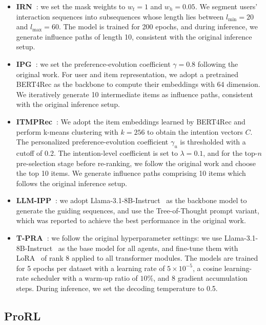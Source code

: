 \documentclass{llmxive}
\begin{document}
\begin{itemize}
    \item \textbf{IRN~\cite{zhu2023influential}}: we set the mask weights to \(w_t = 1\) and \(w_h = 0.05\). We segment users' interaction sequences into subsequences whose length lies between \(l_{\min} = 20\) and \(l_{\max} = 60\). The model is trained for 200 epochs, and during inference, we generate influence paths of length 10, consistent with the original inference setup.
    \item \textbf{IPG~\cite{bi2024proactive}}: we set the preference-evolution coefficient $\gamma=0.8$ following the original work. For user and item representation, we adopt a pretrained BERT4Rec as the backbone to compute their embeddings with 64 dimension. We iteratively generate 10 intermediate items as influence paths, consistent with the original inference setup.
    \item \textbf{ITMPRec~\cite{lian2025itmprec}}: We adopt the item embeddings learned by BERT4Rec and perform k-means clustering with \(k = 256\) to obtain the intention vectors $C$. The personalized preference-evolution coefficient \(\gamma_u\) is thresholded with a cutoff of 0.2. The intention-level coefficient is set to \(\lambda = 0.1\), and for the top-\(n\) pre-selection stage before re-ranking, we follow the original work and choose the top 10 items. We generate influence paths comprising 10 items which follows the original inference setup.
    \item \textbf{LLM-IPP~\cite{wang2025leveraging}}: we adopt Llama-3.1-8B-Instruct~\cite{dubey2024llama} as the backbone model to generate the guiding sequences, and use the Tree-of-Thought prompt variant, which was reported to achieve the best performance in the original work.
    \item \textbf{T-PRA~\cite{wang2025tunable}}: we follow the original hyperparameter settings: we use Llama-3.1-8B-Instruct~\cite{dubey2024llama} as the base model for all agents, and fine-tune them with LoRA~\cite{hu2022lora} of rank 8 applied to all transformer modules. The models are trained for 5 epochs per dataset with a learning rate of \(5\times10^{-5}\), a cosine learning-rate scheduler with a warm-up ratio of \(10\%\), and 8 gradient accumulation steps. During inference, we set the decoding temperature to 0.5.
\end{itemize}

\subsection{ProRL}
\label{app:prorl}
\end{document}
